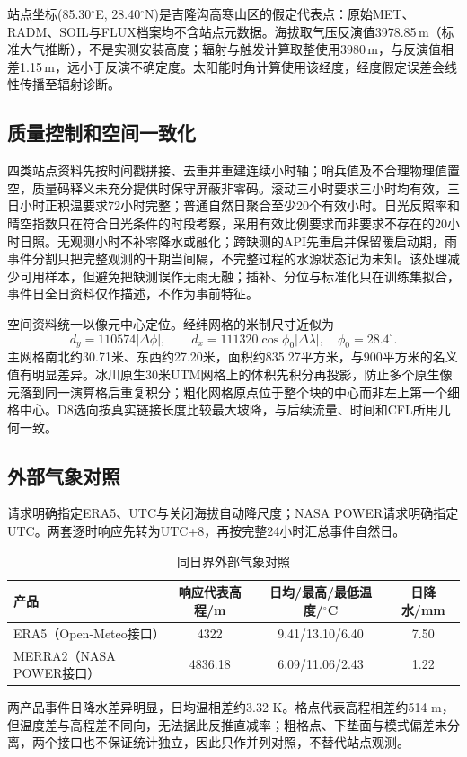 站点坐标(85.30$^\circ$E, 28.40$^\circ$N)是吉隆沟高寒山区的假定代表点：原始MET、RADM、SOIL与FLUX档案均不含站点元数据。海拔取气压反演值3978.85\,m（标准大气推断），不是实测安装高度；辐射与触发计算取整使用3980\,m，与反演值相差1.15\,m，远小于反演不确定度。太阳能时角计算使用该经度，经度假定误差会线性传播至辐射诊断。

\subsection{质量控制和空间一致化}
四类站点资料先按时间戳拼接、去重并重建连续小时轴；哨兵值及不合理物理值置空，质量码释义未充分提供时保守屏蔽非零码。滚动三小时要求三小时均有效，三日小时正积温要求72小时完整；普通自然日聚合至少20个有效小时。日光反照率和晴空指数只在符合日光条件的时段考察，采用有效比例要求而非要求不存在的20小时日照。无观测小时不补零降水或融化；跨缺测的API先重启并保留暖启动期，雨事件分割只把完整观测的干期当间隔，不完整过程的水源状态记为未知。该处理减少可用样本，但避免把缺测误作无雨无融；插补、分位与标准化只在训练集拟合，事件日全日资料仅作描述，不作为事前特征。

空间资料统一以像元中心定位。经纬网格的米制尺寸近似为
\begin{equation}
 d_y=110574|\Delta\phi|,\qquad
 d_x=111320\cos\phi_0|\Delta\lambda|,\quad \phi_0=28.4^\circ.
\end{equation}
主网格南北约30.71米、东西约27.20米，面积约835.27平方米，与900平方米的名义值有明显差异。冰川原生30米UTM网格上的体积先积分再投影，防止多个原生像元落到同一演算格后重复积分；粗化网格原点位于整个块的中心而非左上第一个细格中心。D8选向按真实链接长度比较最大坡降，与后续流量、时间和CFL所用几何一致。

\subsection{外部气象对照}
请求明确指定ERA5、UTC与关闭海拔自动降尺度；NASA POWER请求明确指定UTC。两套逐时响应先转为UTC+8，再按完整24小时汇总事件自然日。
\begin{table}[htbp]\centering\small
\caption{同日界外部气象对照}\label{tab:extmet}
\begin{tabular}{@{}l c c c@{}}\toprule
产品&响应代表高程/m&日均/最高/最低温度/$^\circ$C&日降水/mm\\\midrule
ERA5（Open-Meteo接口）&4322&9.41/13.10/6.40&7.50\\
MERRA2（NASA POWER接口）&4836.18&6.09/11.06/2.43&1.22\\\bottomrule
\end{tabular}\end{table}
两产品事件日降水差异明显，日均温相差约3.32 K。格点代表高程相差约514 m，但温度差与高程差不同向，无法据此反推直减率；粗格点、下垫面与模式偏差未分离，两个接口也不保证统计独立，因此只作并列对照，不替代站点观测。

